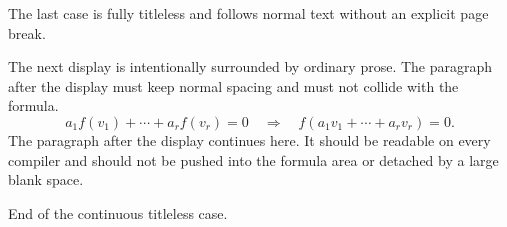 \documentclass[a4paper,10pt]{article}
\newcommand{\mathblock}{%
The next display is intentionally surrounded by ordinary prose. The paragraph
after the display must keep normal spacing and must not collide with the
formula.
\[
  a_1f(v_1)+\cdots+a_rf(v_r)=0
  \quad\Longrightarrow\quad
  f(a_1v_1+\cdots+a_rv_r)=0.
\]
The paragraph after the display continues here. It should be readable on every
compiler and should not be pushed into the formula area or detached by a large
blank space.
}
\newcommand{\plainrun}{%
\lipsum[1-3]
\mathblock
\lipsum[4-7]
}
\begin{document}
\begin{levelone}
The last case is fully titleless and follows normal text without an explicit
page break.

\begin{leveltwo}
\begin{levelthree}
\begin{levelfour}
\plainrun
\end{levelfour}
\end{levelthree}
\end{leveltwo}

End of the continuous titleless case.
\end{levelone}

\lipsum[18-19]
\end{document}
